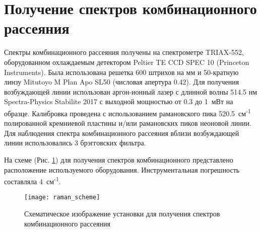 \newpage
\section{Получение спектров комбинационного рассеяния} \label{sect2_6}

Спектры комбинационного рассеяния получены на спектрометре TRIAX-552, оборудованном охлаждаемым детектором Peltier TE CCD SPEC 10 (Princeton Instruments).
Была использована решетка 600 штрихов на мм и 50-кратную линзу Mitutoyo M Plan Apo SL50 (числовая апертура 0.42).
Для получения возбуждающей линии использован аргон-ионный лазер с длинной волны 514.5 нм Spectra-Physics Stabilite 2017 с выходной мощностью от 0.3 до 1~мВт на образце. Калибровка проведена с использованием рамановского пика 520.5~см\textsuperscript{-1} полированной кремниевой пластины и/или рамановских пиков неоновой линии.
Для наблюдения спектра комбинационного рассеяния вблизи возбуждающей линии использовались 3  брэгговских фильтра.

На схеме (Рис. \ref{img:raman}) для получения спектров комбинационного представлено расположение используемого оборудования. Инструментальная погрешность составляла 4~см\textsuperscript{-1}.
\begin{figure}[p!]
  \begin{minipage}[ht]{0.99\linewidth}\centering
    \texttt{[image: raman\_scheme]}
  \end{minipage}


      \caption[Схематическое изображение установки для получения спектров комбинационного рассеяния]{Схематическое изображение установки для получения спектров комбинационного рассеяния}
    \label{img:raman}
\end{figure}

